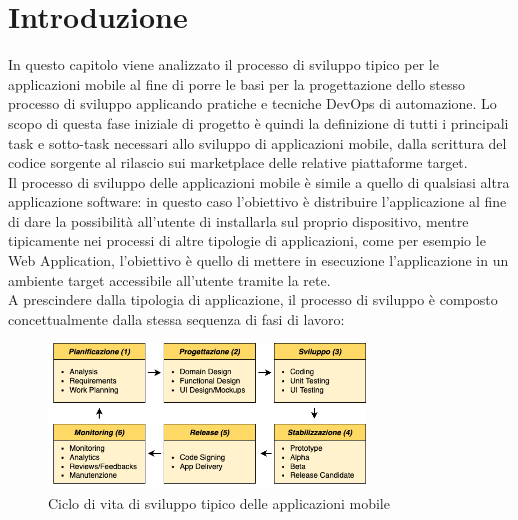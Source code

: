 
\section{Introduzione}
In questo capitolo viene analizzato il processo di sviluppo tipico per le applicazioni mobile al fine di porre le basi per la progettazione dello stesso processo di sviluppo applicando pratiche e tecniche DevOps di automazione. Lo scopo di questa fase iniziale di progetto è quindi la definizione di tutti i principali task e sotto-task necessari allo sviluppo di applicazioni mobile, dalla scrittura del codice sorgente al rilascio sui marketplace delle relative piattaforme target.\\
Il processo di sviluppo delle applicazioni mobile è simile a quello di qualsiasi altra applicazione software: in questo caso l'obiettivo è distribuire l'applicazione al fine di dare la possibilità all'utente di installarla sul proprio dispositivo, mentre tipicamente nei processi di altre tipologie di applicazioni, come per esempio le Web Application, l'obiettivo è quello di mettere in esecuzione l'applicazione in un ambiente target accessibile all'utente tramite la rete.\\
A prescindere dalla tipologia di applicazione, il processo di sviluppo è composto concettualmente dalla stessa sequenza di fasi di lavoro:

\begin{figure}[H]
    \centering
    \includegraphics[width=0.75\textwidth]{img/sdlc.png}
    \caption{Ciclo di vita di sviluppo tipico delle applicazioni mobile}
    \label{sdlc-app-mobile-fig}
\end{figure}


